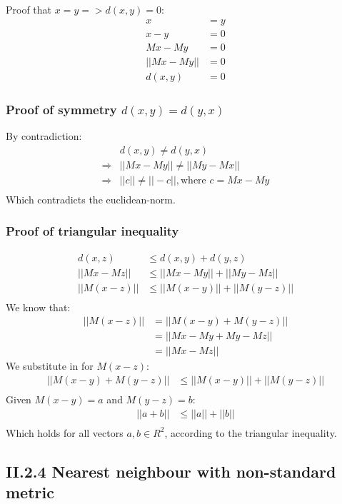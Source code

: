 \documentclass[a4paper,10pt]{article}
\begin{document}
Proof that $x=y => d(x,y)=0$:
\begin{align*}
x&=y\\
x-y&=0\\
Mx-My&=0\\
||Mx-My||&=0\\
d(x,y)&=0
\end{align*}
\subsubsection*{Proof of symmetry $d(x,y)=d(y,x)$}
By contradiction:
\begin{align*}
&d(x,y)\neq d(y,x)\\
\Rightarrow &||Mx-My||\neq ||My-Mx||\\
\Rightarrow &||c||\neq ||-c||, \text{where } c= Mx-My\\
\end{align*}
Which contradicts the euclidean-norm.
\subsubsection*{Proof of triangular inequality}
\begin{align*}
d(x,z) &\leq d(x,y) + d(y,z)\\
||Mx-Mz|| &\leq ||Mx-My|| + ||My-Mz||\\
||M(x-z)|| &\leq ||M(x-y)|| + ||M(y-z)||\\
\end{align*}
We know that:
\begin{align*}
||M(x-z)|| &= ||M(x-y) + M(y-z)||\\
           &= ||Mx-My+My-Mz||\\
	   &= ||Mx-Mz||
\end{align*}
We substitute in for $M(x-z)$:
\begin{align*}
||M(x-y) + M(y-z)|| &\leq ||M(x-y)|| + ||M(y-z)||\\
\end{align*}
Given $M(x-y)=a$ and $M(y-z)=b$:
\begin{align*}
||a + b|| &\leq ||a|| + ||b||\\
\end{align*}
Which holds for all vectors $a,b\in R^2$, according to
the triangular inequality.

\subsection*{II.2.4 Nearest neighbour with non-standard metric}
\end{document}
